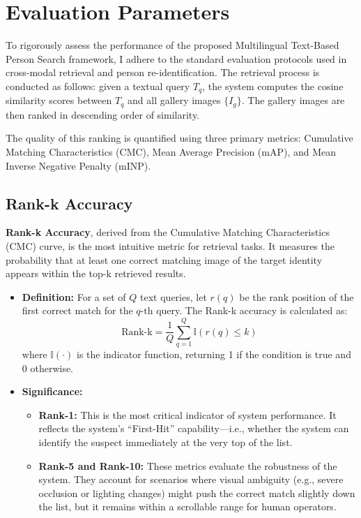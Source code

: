 \documentclass[../main.tex]{subfiles}
\begin{document}
\section{Evaluation Parameters}

To rigorously assess the performance of the proposed Multilingual Text-Based Person Search framework, I adhere to the standard evaluation protocols used in cross-modal retrieval and person re-identification. The retrieval process is conducted as follows: given a textual query $T_q$, the system computes the cosine similarity scores between $T_q$ and all gallery images $\{I_g\}$. The gallery images are then ranked in descending order of similarity.

\noindent The quality of this ranking is quantified using three primary metrics: Cumulative Matching Characteristics (CMC), Mean Average Precision (mAP), and Mean Inverse Negative Penalty (mINP).

\subsection{Rank-k Accuracy}

\noindent \textbf{Rank-k Accuracy}, derived from the Cumulative Matching Characteristics (CMC) curve, is the most intuitive metric for retrieval tasks. It measures the probability that at least one correct matching image of the target identity appears within the top-k retrieved results.

\begin{itemize}
    \item \textbf{Definition:} For a set of $Q$ text queries, let $r(q)$ be the rank position of the first correct match for the $q\text{-th}$ query. The Rank-k accuracy is calculated as:
    \[
    \text{Rank-k} = \frac{1}{Q} \sum_{q=1}^{Q} \mathbb{I}(r(q) \leq k)
    \]
    where $\mathbb{I}(\cdot)$ is the indicator function, returning 1 if the condition is true and 0 otherwise.

    \item \textbf{Significance:}
    \begin{itemize}
        \item \textbf{Rank-1:} This is the most critical indicator of system performance. It reflects the system's ``First-Hit'' capability---i.e., whether the system can identify the suspect immediately at the very top of the list.
        \item \textbf{Rank-5 and Rank-10:} These metrics evaluate the robustness of the system. They account for scenarios where visual ambiguity (e.g., severe occlusion or lighting changes) might push the correct match slightly down the list, but it remains within a scrollable range for human operators.
    \end{itemize}
\end{itemize}
\end{document}
